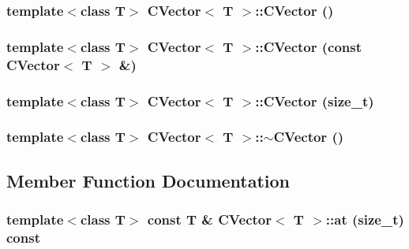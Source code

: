 \subsubsection{\setlength{\rightskip}{0pt plus 5cm}template$<$class T$>$ {\bf CVector}$<$ T $>$::{\bf CVector} ()\hspace{0.3cm}{\tt  [inline]}}\label{classCVector_a0}


\subsubsection{\setlength{\rightskip}{0pt plus 5cm}template$<$class T$>$ {\bf CVector}$<$ T $>$::{\bf CVector} (const {\bf CVector}$<$ T $>$ \&)\hspace{0.3cm}{\tt  [inline]}}\label{classCVector_a1}


\subsubsection{\setlength{\rightskip}{0pt plus 5cm}template$<$class T$>$ {\bf CVector}$<$ T $>$::{\bf CVector} (size\_\-t)\hspace{0.3cm}{\tt  [inline]}}\label{classCVector_a2}


\subsubsection{\setlength{\rightskip}{0pt plus 5cm}template$<$class T$>$ {\bf CVector}$<$ T $>$::$\sim${\bf CVector} ()\hspace{0.3cm}{\tt  [inline]}}\label{classCVector_a3}




\subsection{Member Function Documentation}
\subsubsection{\setlength{\rightskip}{0pt plus 5cm}template$<$class T$>$ const T \& {\bf CVector}$<$ T $>$::at (size\_\-t) const\hspace{0.3cm}{\tt  [inline]}}\label{classCVector_a8}


